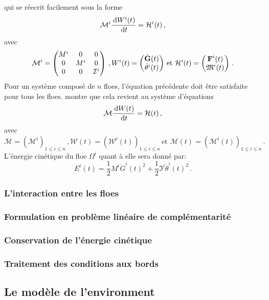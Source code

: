 qui se réecrit facilement sous la forme 
\begin{align}    
    \mathcal{M}^i \frac{\diff W^i(t)}{\diff t} = \mathcal{H}^i(t) \,,
\end{align}
avec 
$$
\mathcal{M}^i = 
\begin{pmatrix}
    M^i & 0 & 0 \\ 0 & M^i & 0 \\ 0 & 0 & \mathcal{I}^i
\end{pmatrix} \,,
W^i(t) = 
\begin{pmatrix}
    \dot{\bm{\mathrm{G}}}(t) \\ \dot{\theta}^i(t)
\end{pmatrix} \,
\text{et } \mathcal{H}^i(t) = 
\begin{pmatrix}
    \bm{\mathrm{F}}^i(t) \\ \mathfrak{M}^i(t)
\end{pmatrix} \,.
$$
Pour un système composé de $n$ floes, l'équation précédente doit être satisfaite pour tous les floes. \cite[p.18]{rabatel2015thesis} montre que cela revient au système d'équations
\begin{align}    
    \mathcal{M} \frac{\diff W(t)}{\diff t} = \mathcal{H}(t) \,,
\end{align}
avec 
$$
\mathcal{M} = (\mathcal{M}^i)_{1\leq i \leq n } \,,
\mathcal{W}(t) = (\mathcal{W}^i(t))_{1\leq i \leq n } \, \text{et }
\mathcal{M}(t) = (\mathcal{M}^i(t))_{1\leq i \leq n }  \,.
$$
L'énergie cinétique du floe $\Omega^i$ quant à elle sera donné par:
$$
E^i(t) = \frac{1}{2}M^i \dot{G}^i(t)^2 + \frac{1}{2}\mathfrak{I}^i \dot{\theta}^i(t)^2 \,. 
$$ 



\subsubsection{L'interaction entre les floes}



\subsubsection{Formulation en problème linéaire de complémentarité}

\subsubsection{Conservation de l'énergie cinétique}

\subsubsection{Traitement des conditions aux bords}

\subsection{Le modèle de l'environment}



